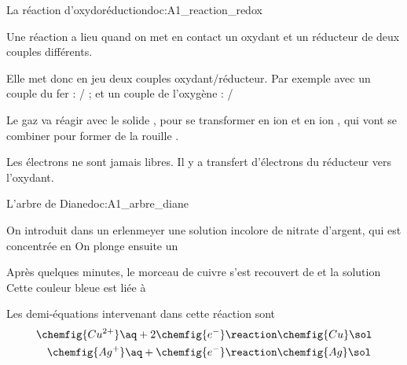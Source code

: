 \begin{doc}{La réaction d'oxydoréduction}{doc:A1_reaction_redox}
  \begin{importants}
    Une réaction  a lieu quand on met en contact un oxydant et un réducteur de deux couples différents.
  \end{importants}
  
  Elle met donc en jeu deux couples oxydant/réducteur.
  Par exemple avec un couple du fer : / ; et un couple de l'oxygène : /

  Le gaz  va réagir avec le solide , pour se transformer en ion  et en ion , qui vont se combiner pour former de la rouille .

  \begin{importants}
    Les électrons ne sont jamais libres.
    Il y a transfert d'électrons du réducteur vers l'oxydant.
  \end{importants}
\end{doc}


\begin{doc}{L'arbre de Diane}{doc:A1_arbre_diane}
  \begin{wrapfigure}[4]{r}{0.1\linewidth}
    \vspace*{-24pt}
  \end{wrapfigure}

  \moleculesGras
  On introduit dans un erlenmeyer une solution incolore de nitrate d'argent, qui est concentrée en 
  On plonge ensuite un 

  Après quelques minutes, le morceau de cuivre s'est recouvert de  et la solution 
  Cette couleur bleue est liée à 
  \moleculesNormale

  Les demi-équations intervenant dans  cette réaction sont
  \begin{align*}
    \chemfig{Cu^{2+}}\aq + 2\chemfig{e^{-}} &\reaction \chemfig{Cu}\sol \\
    \chemfig{Ag^+}\aq + \chemfig{e^{-}} &\reaction \chemfig{Ag}\sol
  \end{align*}
\end{doc}

